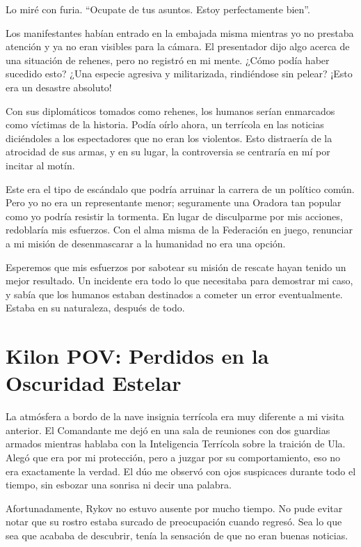 \documentclass[spanish,12pt,a4paper,oneside,titlepage]{book}
\begin{document}
    Lo miré con furia. ``Ocupate de tus asuntos. Estoy perfectamente bien''.

    Los manifestantes habían entrado en la embajada misma mientras yo no prestaba atención y ya no eran visibles para la cámara. El presentador dijo algo acerca de una situación de rehenes, pero no registró en mi mente. ¿Cómo podía haber sucedido esto? ¿Una especie agresiva y militarizada, rindiéndose sin pelear? ¡Esto era un desastre absoluto!

    Con sus diplomáticos tomados como rehenes, los humanos serían enmarcados como víctimas de la historia. Podía oírlo ahora, un terrícola en las noticias diciéndoles a los espectadores que no eran los violentos. Esto distraería de la atrocidad de sus armas, y en su lugar, la controversia se centraría en mí por incitar al motín.

    Este era el tipo de escándalo que podría arruinar la carrera de un político común. Pero yo no era un representante menor; seguramente una Oradora tan popular como yo podría resistir la tormenta. En lugar de disculparme por mis acciones, redoblaría mis esfuerzos. Con el alma misma de la Federación en juego, renunciar a mi misión de desenmascarar a la humanidad no era una opción.

    Esperemos que mis esfuerzos por sabotear su misión de rescate hayan tenido un mejor resultado. Un incidente era todo lo que necesitaba para demostrar mi caso, y sabía que los humanos estaban destinados a cometer un error eventualmente. Estaba en su naturaleza, después de todo.

    \chapter{Kilon POV: Perdidos en la Oscuridad Estelar}

    La atmósfera a bordo de la nave insignia terrícola era muy diferente a mi visita anterior. El Comandante me dejó en una sala de reuniones con dos guardias armados mientras hablaba con la Inteligencia Terrícola sobre la traición de Ula. Alegó que era por mi protección, pero a juzgar por su comportamiento, eso no era exactamente la verdad. El dúo me observó con ojos suspicaces durante todo el tiempo, sin esbozar una sonrisa ni decir una palabra.

    Afortunadamente, Rykov no estuvo ausente por mucho tiempo. No pude evitar notar que su rostro estaba surcado de preocupación cuando regresó. Sea lo que sea que acababa de descubrir, tenía la sensación de que no eran buenas noticias.
\end{document}
